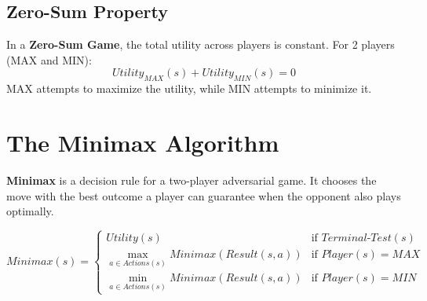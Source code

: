 \documentclass[12pt,a4paper]{article}
\begin{document}
\subsection{Zero-Sum Property}
In a \textbf{Zero-Sum Game}, the total utility across players is constant. For 2 players (MAX and MIN):
\begin{equation}
  Utility_{MAX}(s) + Utility_{MIN}(s) = 0
\end{equation}
MAX attempts to maximize the utility, while MIN attempts to minimize it.

\section{The Minimax Algorithm}

\begin{tcolorbox}[defbox, title={Minimax}]
\textbf{Minimax} is a decision rule for a two-player adversarial game. It chooses the move with the best outcome a player can guarantee when the opponent also plays optimally.
\end{tcolorbox}

\begin{tcolorbox}[formulabox, title={Minimax Value Definition}]
  \begin{equation}
    Minimax(s) = \begin{cases}
      Utility(s) & \text{if } Terminal\text{-}Test(s) \\
      \max_{a \in Actions(s)} Minimax(Result(s, a)) & \text{if } Player(s) = MAX \\
      \min_{a \in Actions(s)} Minimax(Result(s, a)) & \text{if } Player(s) = MIN
    \end{cases}
  \end{equation}
\end{tcolorbox}

\begin{tcolorbox}[tikzbox, title={Minimax Game Tree Visualization}]
\centering
{}
\end{tcolorbox}
\end{document}
